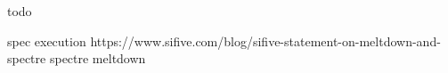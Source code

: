 todo 

spec execution https://www.sifive.com/blog/sifive-statement-on-meltdown-and-spectre
spectre meltdown